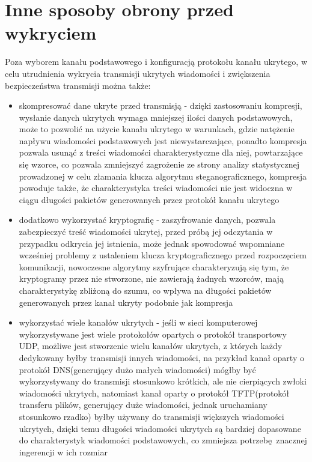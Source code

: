 \documentclass[a4paper, twoside, 12pt]{report}
\begin{document}
    \section{Inne sposoby obrony przed wykryciem}
       Poza wyborem kanału podstawowego i konfiguracją protokołu kanału ukrytego,
       w celu utrudnienia wykrycia transmisji ukrytych wiadomości i zwiększenia
       bezpieczeństwa transmisji można także:
       \begin{itemize}
           \item skompresować dane ukryte przed transmisją - dzięki zastosowaniu
               kompresji, wysłanie danych ukrytych wymaga mniejszej ilości
               danych podstawowych, może to pozwolić na użycie kanału ukrytego
               w warunkach, gdzie natężenie napływu wiadomości podstawowych
               jest niewystarczające, ponadto kompresja pozwala usunąć z treści
               wiadomości charakterystyczne dla niej, powtarzające się wzorce,
               co pozwala zmniejszyć zagrożenie ze strony analizy statystycznej
               prowadzonej w celu złamania klucza algorytmu steganograficznego,
               kompresja powoduje także, że charakterystyka treści wiadomości nie jest widoczna
               w ciągu długości pakietów generowanych przez protokół kanału ukrytego
           \item dodatkowo wykorzystać kryptografię - zaszyfrowanie danych, pozwala
               zabezpieczyć treść wiadomości ukrytej, przed próbą jej odczytania w
               przypadku odkrycia jej istnienia, może jednak spowodować wspomniane
               wcześniej problemy z ustaleniem klucza kryptograficznego przed rozpoczęciem
               komunikacji, nowoczesne algorytmy szyfrujące charakteryzują się
               tym, że kryptogramy przez nie stworzone, nie zawierają żadnych wzorców,
               mają charakterystykę zbliżoną do szumu, co wpływa na długości pakietów
               generowanych przez kanał ukryty podobnie jak kompresja
           \item wykorzystać wiele kanałów ukrytych - jeśli w sieci komputerowej
               wykorzystywane jest wiele protokołów opartych o protokół transportowy UDP,
               możliwe jest stworzenie wielu kanałów ukrytych, z których każdy dedykowany
               byłby transmisji innych wiadomości, na przykład kanał oparty o protokół
               DNS(generujący dużo małych wiadomości)  mógłby być wykorzystywany
               do transmisji stosunkowo krótkich, ale nie cierpiących zwłoki wiadomości
               ukrytych, natomiast kanał oparty o protokół TFTP(protokół transferu plików,
               generujący duże wiadomości, jednak uruchamiany stosunkowo rzadko)
               byłby używany do transmisji większych wiadomości ukrytych, dzięki
               temu długości wiadomości ukrytych są bardziej dopasowane do charakterystyk
               wiadomości podstawowych, co zmniejsza potrzebę znacznej ingerencji
               w ich rozmiar


\end{itemize}
\end{document}
